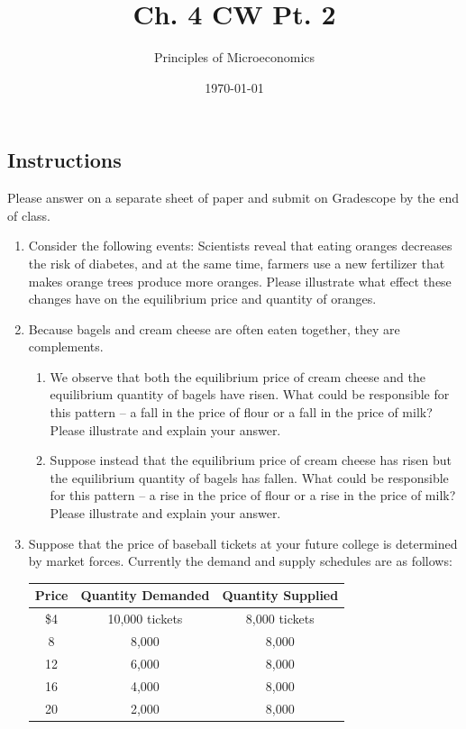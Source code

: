 \documentclass{article}
\title{Ch. 4 CW Pt. 2}
\author{Principles of Microeconomics}
\date{\today}
\begin{document}
\maketitle

\subsection*{Instructions} Please answer on a separate sheet of paper and submit on Gradescope by the end of class.

\begin{enumerate}

\item Consider the following events: Scientists reveal that eating oranges decreases the risk of diabetes, and at the same time, farmers use a new fertilizer that makes orange trees produce more oranges. Please illustrate what effect these changes have on the equilibrium price and quantity of oranges.

\item Because bagels and cream cheese are often eaten together, they are complements.

	\begin{enumerate}
	
	\item We observe that both the equilibrium price of cream cheese and the equilibrium quantity of bagels have risen. What could be responsible for this pattern -- a fall in the price of flour or a fall in the price of milk? Please illustrate and explain your answer.
	
	\item Suppose instead that the equilibrium price of cream cheese has risen but the equilibrium quantity of bagels has fallen. What could be responsible for this pattern -- a rise in the price of flour or a rise in the price of milk? Please illustrate and explain your answer.
	
	\end{enumerate}
	
\item Suppose that the price of baseball tickets at your future college is determined by market forces. Currently the demand and supply schedules are as follows:

	\begin{center}
	\begin{tabular}{c c c}
	\textbf{Price} & \textbf{Quantity Demanded} & \textbf{Quantity Supplied} \\
	\hline
	\$4 & 10,000 tickets & 8,000 tickets \\
	8 & 8,000 & 8,000 \\
	12 & 6,000 & 8,000 \\
	16 & 4,000 & 8,000 \\
	20 & 2,000 & 8,000
	\end{tabular}
	\end{center}
	

\end{enumerate}
\end{document}
